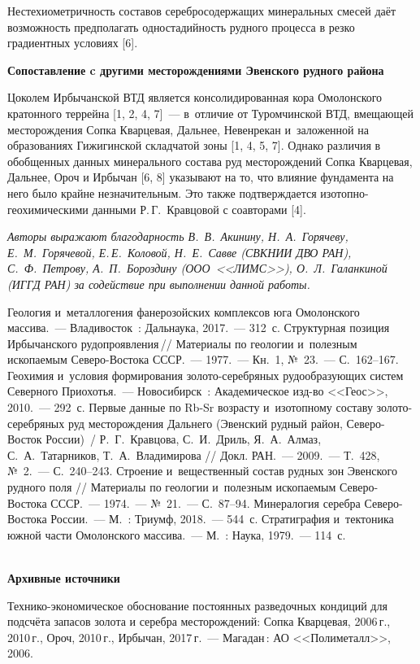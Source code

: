  Нестехиометричность составов серебросодержащих минеральных смесей даёт
 возможность предполагать одностадийность рудного процесса в резко
 градиентных условиях [6].

\textbf{Сопоставление c другими месторождениями Эвенского рудного района}

Цоколем Ирбычанской ВТД является консолидированная кора Омолонского кратонного террейна [1, 2, 4, 7]~--- в~отличие от Туромчинской ВТД, вмещающей месторождения Сопка Кварцевая, Дальнее, Невенрекан и~заложенной на образованиях Гижигинской складчатой зоны [1, 4, 5, 7]. Однако различия в обобщенных данных минерального состава руд
месторождений Сопка Кварцевая, Дальнее, Ороч и Ирбычан [6, 8] указывают на то, что влияние
фундамента на него было крайне незначительным. Это также подтверждается
изотопно-геохимическими данными Р.\,Г.~Кравцовой с соавторами [4].

\textit{Авторы выражают благодарность В.~В.~Акинину,  Н.~А.~Горячеву, Е.~М.~Горячевой, Е.\,Е.~Коловой, Н.~Е.~Савве (СВКНИИ ДВО РАН), С.~Ф.~Петрову, А.~П.~Бороздину (ООО~<<ЛИМС>>), О.~Л.~Галанкиной (ИГГД РАН) за содействие при выполнении данной работы.}


\begin{thebibliography}{99}

\bibitem{}
 Геология и~металлогения фанерозойских комплексов юга Омолонского массива.~--- Владивосток~: Дальнаука, 2017.~--- 312~с.
\bibitem{}
 Структурная позиция Ирбычанского рудопроявления\,// Материалы по геологии и~полезным ископаемым Северо-Востока СССР.~--- 1977.~---  Кн.~1, №~23.~--- С.~162--167.
\bibitem{}
 Геохимия и~условия формирования золото-серебряных рудообразующих систем Северного Приохотья.~--- Новосибирск~: Академическое изд-во <<Геос>>, 2010.~--- 292~с.
\bibitem{}
 Первые данные по Rb-Sr возрасту и~изотопному составу золото-серебряных руд месторождения Дальнего (Эвенский рудный район, Северо-Восток России)~/ Р.~Г.~Кравцова, С.~И.~Дриль, Я.~А.~Алмаз, С.~А.~Татарников, Т.~А.~Владимирова // Докл. РАН.~--- 2009.~--- Т.~428, №~2.~--- С.~240--243.
\bibitem{}
 Строение и~вещественный состав рудных зон Эвенского рудного поля // Материалы по геологии и~полезным ископаемым Северо-Востока СССР.~--- 1974.~--- №~21.~--- С.~87--94.
\bibitem{}
 Минералогия серебра Северо-Востока России.~--- М.~: Триумф, 2018.~--- 544~с.
\bibitem{}
 Стратиграфия и~тектоника южной части Омолонского массива.~--- М.~: Наука, 1979.~--- 114~с.

\textbf{\\Архивные источники}

\bibitem{}Технико-экономическое обоснование постоянных разведочных кондиций для подсчёта запасов золота и серебра месторождений: Сопка Кварцевая, 2006\,г., 2010\,г., Ороч, 2010\,г., Ирбычан, 2017\,г.~--- Магадан\,: АО <<Полиметалл>>, 2006.

\end{thebibliography}
\thispagestyle{empty}
